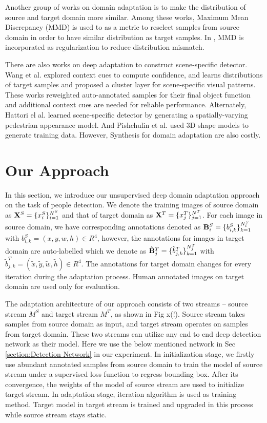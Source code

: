 \documentclass[runningheads]{llncs}
\begin{document}
Another group of works \cite{huang2006correcting,gretton2009covariate,gong2013connecting} on domain adaptation is to make the distribution of source and target domain more similar. Among these works, Maximum Mean Discrepancy (MMD) is used to as a metric to reselect samples from source domain in order to have similar distribution as target samples. In \cite{ghifary2014domain}, MMD is incorporated as regularization to reduce distribution mismatch.

There are also works on deep adaptation to construct scene-specific detector. Wang et al.\cite{wang2014scene} explored context cues to compute confidence, and \cite{zeng2014deep} learns distributions of target samples and proposed a cluster layer for scene-specific visual patterns. These works reweighted auto-annotated samples for their final object function and additional context cues are needed for reliable performance. Alternately, Hattori el al. \cite{hattori2015learning} learned scene-specific detector by generating a spatially-varying pedestrian appearance model. And Pishchulin et al. \cite{pishchulin2011learning} used 3D shape models to generate training data. However, Synthesis for domain adaptation are also costly.

\section{Our Approach}
\label{section:Our Approach}

In this section, we introduce our unsupervised deep domain adaptation approach on the task of people detection. We denote the training images of source domain as  ${\bf X}^{S} = \{x^{S}_{i}\}^{N^{S}}_{i=1}$ and that of target domain as ${\bf X}^{T} = \{x^{T}_{j}\}^{N^{T}}_{j=1}$. For each image in source domain, we have corresponding annotations denoted as ${\bf B}^{S}_{i} = \{b^{S}_{i,k}\}^{N^{S}_{i}}_{k=1}$ with $b^{S}_{i,k} = (x,y,w,h) \in R^{4}$, however, the annotations for images in target domain are auto-labelled which we denote as ${\bf \tilde{B}}^{T}_{j} = \{\tilde{b}^{T}_{j,k}\}^{N^{T}_{j}}_{k=1}$ with $\tilde{b}^{T}_{j,k} = (\tilde{x},\tilde{y},\tilde{w},\tilde{h}) \in R^{4}$. The annotations for target domain changes for every iteration during the adaptation process. Human annotated images on target domain are used only for evaluation.

The adaptation architecture of our approach consists of two streams -- source stream $M^{S}$ and target stream $M^{T}$, as shown in Fig x(!). Source stream takes samples from source domain as input, and target stream operates on samples from target domain. These two streams can utilize any end to end deep detection network as their model. Here we use the below mentioned network in Sec \ref{section:Detection Network} in our experiment. In initialization stage, we firstly use abundant annotated samples from source domain to train the model of source stream under a supervised loss function to regress bounding box. After its convergence, the weights of the model of source stream are used to initialize target stream. In adaptation stage, iteration algorithm is used as training method. Target model in target stream is trained and upgraded in this process while source stream stays static.
\end{document}

